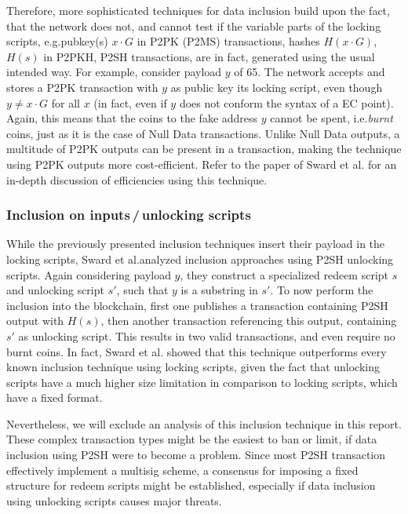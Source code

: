 \documentclass[a4paper,11pt,titlepage]{scrbook}
\begin{document}
Therefore, more sophisticated techniques for data inclusion build upon the fact, that the network does not, and cannot test if the variable parts of the locking scripts, e.g.\@ pubkey(s) $x\cdot G$ in P2PK (P2MS) transactions, hashes $H(x\cdot G)$, $H(s)$ in P2PKH, P2SH transactions, are in fact, generated using the usual intended way.
For example, consider payload $y$ of \SI{65}{\byte}.
The network accepts and stores a P2PK transaction with $y$ as  public key its locking script, even though $y\neq x\cdot G$ for all $x$ (in fact, even if $y$ does not conform the syntax of a EC point).
Again, this means that the coins  to the fake address $y$ cannot be spent, i.e.\@ \emph{burnt} coins, just as it is the case of Null Data transactions.
Unlike Null Data outputs, a multitude of P2PK outputs can be present in a transaction, making the technique using P2PK outputs more cost-efficient.
Refer to the paper of Sward et al.\@ \cite{sward_data_2018} for an in-depth discussion of efficiencies using this technique.

\subsubsection*{Inclusion on inputs\,/\,unlocking scripts}
While the previously presented inclusion techniques insert their payload in the locking scripts, Sward et al.\@ analyzed inclusion approaches using P2SH unlocking scripts.
Again considering payload $y$, they construct a specialized redeem script $s$ and unlocking script $s'$, 
such that $y$ is a substring in $s'$.
To now perform the inclusion into the blockchain, first one publishes a transaction containing P2SH output with $H(s)$, then another transaction referencing this output, containing $s'$ as unlocking script.
This results in two valid transactions, and even require no burnt coins.
In fact, Sward et al. showed that this technique outperforms every known inclusion technique using locking scripts, given the fact that unlocking scripts have a much higher size limitation in comparison to locking scripts, which have a fixed format. \cite{sward_data_2018}

Nevertheless, we will exclude an analysis of this inclusion technique in this report.
These complex transaction types might be the easiest to ban or limit, if data inclusion using P2SH were to become a problem.
Since most P2SH transaction effectively implement a multisig scheme, a consensus for imposing a fixed structure for redeem scripts might be established, especially if data inclusion using unlocking scripts causes major threats.
\end{document}

